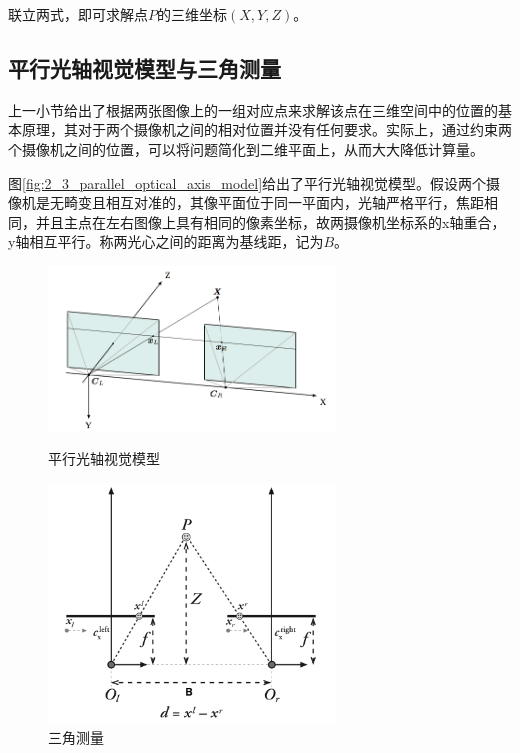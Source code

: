 联立两式，即可求解点$P$的三维坐标$(X, Y, Z)$。

\subsection{平行光轴视觉模型与三角测量}
上一小节给出了根据两张图像上的一组对应点来求解该点在三维空间中的位置的基本原理，其对于两个摄像机之间的相对位置并没有任何要求。实际上，通过约束两个摄像机之间的位置，可以将问题简化到二维平面上，从而大大降低计算量。

图\ref{fig:2_3_parallel_optical_axis_model}给出了平行光轴视觉模型。假设两个摄像机是无畸变且相互对准的，其像平面位于同一平面内，光轴严格平行，焦距相同，并且主点在左右图像上具有相同的像素坐标，故两摄像机坐标系的x轴重合，y轴相互平行。称两光心之间的距离为基线距，记为$B$。

\begin{figure}[!htb] %
	\centering
	\begin{minipage}[c]{0.48\textwidth}
		\centering
		\vspace{0.8in} %
		\includegraphics[width=3in]{figures/2_3_parallel_optical_axis_model}
		\caption{平行光轴视觉模型}\label{fig:2_3_parallel_optical_axis_model}
	\end{minipage}
	\hfill
	\begin{minipage}[c]{0.48\textwidth}
		\centering
		\includegraphics[width=3in]{figures/2_3_triangulation}
		\caption{三角测量}\label{fig:2_3_triangulation}
	\end{minipage}
\end{figure}

